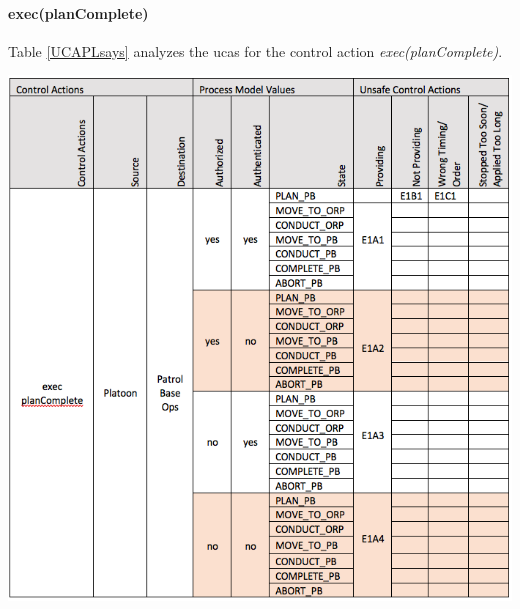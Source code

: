 \documentclass[../../main/main.tex]{subfiles}
\begin{document}
\clearpage
\paragraph*{exec(planComplete)}
Table \ref{UCAPLsays} analyzes the \glspl{uca} for the control action \textit{exec(planComplete)}.

\begin{table}[ht!]
\begin{center}
\includegraphics[width=\linewidth]{../figures/UCAexecplan}
\caption{Unsafe control actions \glspl{uca} for control action "exec(planComplete)."}
\label{UCAexecplan}
\end{center}
\end{table}

\clearpage
\end{document}
